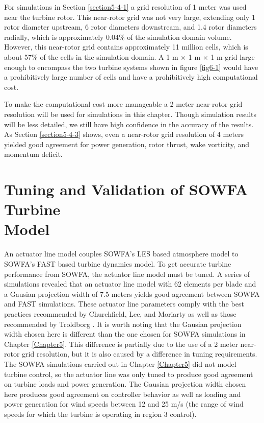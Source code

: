 For simulations in Section \ref{section5-4-1} a grid resolution of 1 meter was used near the turbine rotor. This near-rotor grid was not very large, extending only 1 rotor diameter upstream, 6 rotor diameters downstream, and 1.4 rotor diameters radially, which is approximately 0.04\% of the simulation domain volume. However, this near-rotor grid contains approximately 11 million cells, which is about 57\% of the cells in the simulation domain. A 1 m $\times$ 1 m $\times$ 1 m grid large enough to encompass the two turbine systems shown in figure \ref{fig6-1} would have a prohibitively large number of cells and have a prohibitively high computational cost. 

To make the computational cost more manageable a 2 meter near-rotor grid resolution will be used for simulations in this chapter. Though simulation results will be less detailed, we still have high confidence in the accuracy of the results. As Section \ref{section5-4-3} shows, even a near-rotor grid resolution of 4 meters yielded good agreement for power generation, rotor thrust, wake vorticity, and momentum deficit.  


\section{Tuning and Validation of SOWFA Turbine \\
		Model} \label{section6-4}

An actuator line model couples SOWFA's LES based atmosphere model to SOWFA's FAST based turbine dynamics model. To get accurate turbine performance from SOWFA, the actuator line model must be tuned. A series of simulations revealed that an actuator line model with 62 elements per blade and a Gausian projection width of 7.5 meters yields good agreement between SOWFA and FAST simulations. These actuator line parameters comply with the best practices recommended by Churchfield, Lee, and Moriarty \cite{churchfield2012} as well as those recommended by Troldborg \cite{troldborg2009}. It is worth noting that the Gausian projection width chosen here is different than the one chosen for SOWFA simulations in Chapter \ref{Chapter5}. This difference is partially due to the use of a 2 meter near-rotor grid resolution, but it is also caused by a difference in tuning requirements. The SOWFA simulations carried out in Chapter \ref{Chapter5} did not model turbine control, so the actuator line was only tuned to produce good agreement on turbine loads and power generation. The Gausian projection width chosen here produces good agreement on controller behavior as well as loading and power generation for wind speeds between 12 and 25 m/s (the range of wind speeds for which the turbine is operating in region 3 control).

